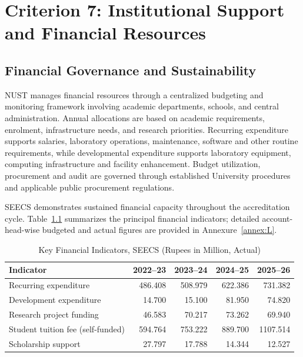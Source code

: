 \hypertarget{criterion-7-institutional-support-and-financial-resources}{%
\chapter{Criterion 7: Institutional Support and Financial Resources}\label{criterion-7-institutional-support-and-financial-resources}}

\hypertarget{financial-governance-sustainability-c7}{%
\section{Financial Governance and Sustainability}\label{financial-governance-sustainability-c7}}

NUST manages financial resources through a centralized budgeting and monitoring framework involving academic departments, schools, and central administration. Annual allocations are based on academic requirements, enrolment, infrastructure needs, and research priorities. Recurring expenditure supports salaries, laboratory operations, maintenance, software and other routine requirements, while developmental expenditure supports laboratory equipment, computing infrastructure and facility enhancement. Budget utilization, procurement and audit are governed through established University procedures and applicable public procurement regulations.

SEECS demonstrates sustained financial capacity throughout the accreditation cycle. Table~\ref{tab:c7_financial_trends} summarizes the principal financial indicators; detailed account-head-wise budgeted and actual figures are provided in Annexure~\ref{annex:L}.

\begin{table}[H]
\centering
\caption{Key Financial Indicators, SEECS (Rupees in Million, Actual)}
\label{tab:c7_financial_trends}
\begingroup\footnotesize
\setlength{\tabcolsep}{4.5pt}
\renewcommand{\arraystretch}{1.12}
\begin{tabular}{@{}lrrrr@{}}
\toprule
\textbf{Indicator} & \textbf{2022--23} & \textbf{2023--24} & \textbf{2024--25} & \textbf{2025--26} \\
\midrule
Recurring expenditure & 486.408 & 508.979 & 622.386 & 731.382 \\
Development expenditure & 14.700 & 15.100 & 81.950 & 74.820 \\
Research project funding & 46.583 & 70.217 & 73.262 & 69.940 \\
Student tuition fee (self-funded) & 594.764 & 753.222 & 889.700 & 1107.514 \\
Scholarship support & 27.797 & 17.788 & 14.344 & 12.527 \\
\bottomrule
\end{tabular}
\endgroup
\end{table}

